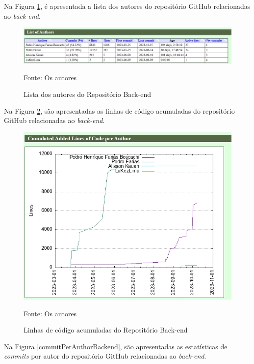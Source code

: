 \begin{apendicesenv}
Na Figura \ref{listOfAuthorsBackend}, é apresentada a lista dos autores do repositório GitHub relacionadas ao \textit{back-end}.

\begin{figure}[H]
	\centering
	\includegraphics[scale=0.65]{./imagens/metricas/gitStatsBackend/authors/listOfAuthors.png}
	\caption{Lista dos autores do Repositório Back-end}
	Fonte: Os autores
    \label{listOfAuthorsBackend}
\end{figure}

Na Figura \ref{cumulatedLinesBackend}, são apresentadas as linhas de código acumuladas do repositório GitHub relacionadas ao \textit{back-end}.

\begin{figure}[H]
	\centering
	\includegraphics[scale=0.7]{./imagens/metricas/gitStatsBackend/authors/cumulatedLines.png}
	\caption{Linhas de código acumuladas do Repositório Back-end}
	Fonte: Os autores
    \label{cumulatedLinesBackend}
\end{figure}
\pagebreak

Na Figura \ref{commitPerAuthorBackend}, são apresentadas as estatísticas de \textit{commits} por autor do repositório GitHub relacionadas ao \textit{back-end}.


\end{apendicesenv}

